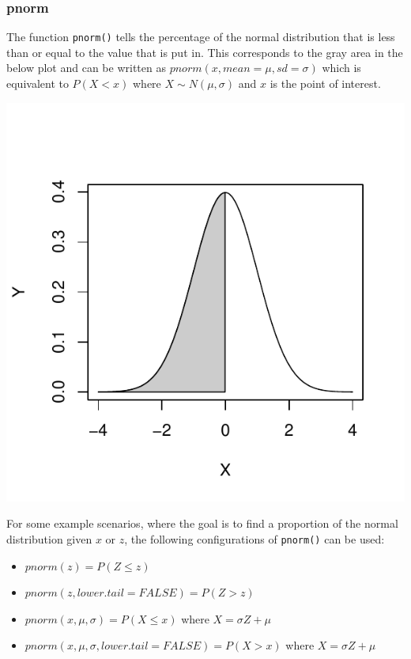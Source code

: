 \documentclass{report}\usepackage[]{graphicx}\usepackage[]{color}
\makeatletter
\def\maxwidth{ %
  \ifdim\Gin@nat@width>\linewidth
    \linewidth
  \else
    \Gin@nat@width
  \fi
}
\newenvironment{knitrout}{}{} %
\makeatother
\begin{document}
\subsubsection{pnorm} 
The function \texttt{pnorm()} tells the percentage of the normal distribution that is less than or equal to the value that is put in.  This corresponds to the gray area in the below plot and can be written as $pnorm(x, mean = \mu, sd = \sigma)$ which is equivalent to $P(X < x)$ where $X \sim N(\mu, \sigma)$ and $x$ is the point of interest.    
 
\begin{knitrout}
\color{fgcolor}

{\centering \includegraphics[width=\maxwidth]{figure/unnamed-chunk-54-1} 

}



\end{knitrout}

For some example scenarios, where the goal is to find a proportion of the normal distribution given $x$ or $z$, the following configurations of \texttt{pnorm()} can be used: 
\begin{itemize}
\item $pnorm(z) = P(Z \leq z)$ 
\item $pnorm(z, lower.tail = FALSE) = P(Z > z)$ 
\item $pnorm(x, \mu, \sigma) = P(X \leq x)$ where $X = \sigma Z + \mu$ 
\item $pnorm(x, \mu, \sigma, lower.tail = FALSE) = P(X > x)$ where $X = \sigma Z + \mu$ 
\end{itemize}
\end{document}

